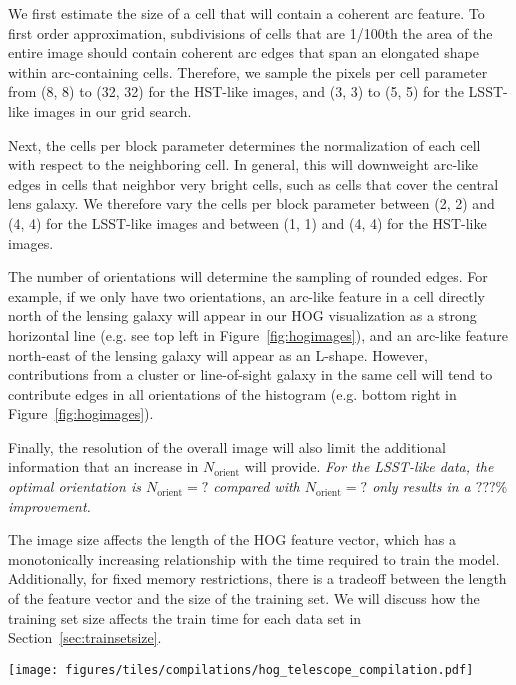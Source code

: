 \documentclass{emulateapj}
\newcommand{\wording}[1]{{\it\color{purple} #1}}
\begin{document}
We first estimate the size of a cell that will contain a coherent arc
feature.  To first order approximation, subdivisions of cells that are
1/100th the area of the entire image should contain coherent arc edges
that span an elongated shape within arc-containing cells.  Therefore,
we sample the pixels per cell parameter from (8, 8) to (32, 32) for
the HST-like images, and (3, 3) to (5, 5) for the LSST-like images in
our grid search.

Next, the cells per block parameter determines the normalization of
each cell with respect to the neighboring cell.  In general, this will
downweight arc-like edges in cells that neighbor very bright cells,
such as cells that cover the central lens galaxy.  We therefore vary
the cells per block parameter between (2, 2) and (4, 4) for the
LSST-like images and between (1, 1) and (4, 4) for the HST-like
images.

The number of orientations will determine the sampling of rounded
edges.  For example, if we only have two orientations, an arc-like
feature in a cell directly north of the lensing galaxy will appear in
our HOG visualization as a strong horizontal line (e.g. see top left
in Figure~\ref{fig:hogimages}), and an arc-like feature north-east of
the lensing galaxy will appear as an L-shape.  However, contributions
from a cluster or line-of-sight galaxy in the same cell will tend to
contribute edges in all orientations of the histogram (e.g. bottom
right in Figure~\ref{fig:hogimages}).  

Finally, the resolution of the overall image will also limit the
additional information that an increase in $N_\text{orient}$ will
provide.  \wording{For the LSST-like data, the optimal orientation is
  $N_\text{orient}=?$ compared with $N_\text{orient}=?$ only results
  in a $???\%$ improvement.}

The image size affects the length of the HOG feature vector, which has
a monotonically increasing relationship with the time required to
train the model.  Additionally, for fixed memory restrictions, there
is a tradeoff between the length of the feature vector and the size of
the training set.  We will discuss how the training set size affects
the train time for each data set in Section~\ref{sec:trainsetsize}.

\begin{figure*}[t]\label{fig:hogimages}
\begin{center}
\texttt{[image: figures/tiles/compilations/hog\_telescope\_compilation.pdf]}
\caption{Left to right show example image transforms of mock images
  from Figure~\ref{fig:mockimages} with a visualized histogram of
  oriented gradients.  The image transform picks up edge features,
  with arc features showing up as edges across radial orientations.}
\end{center}
\end{figure*}
\end{document}

